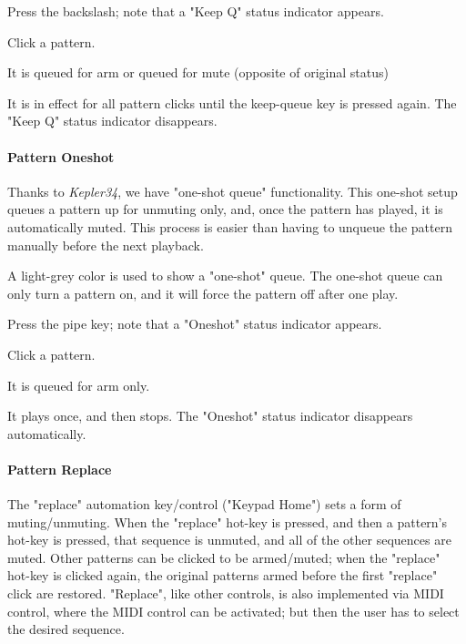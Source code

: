    \begin{enumber}
      \item Press the backslash; note that a "Keep Q" status indicator appears.
      \item Click a pattern.
      \item It is queued for arm or queued for mute (opposite of original status)
      \item It is in effect for all pattern clicks until the keep-queue key
         is pressed again.
         The "Keep Q" status indicator disappears.
   \end{enumber}

\paragraph{Pattern Oneshot}
\label{paragraph:patterns_pattern_oneshot}

   Thanks to \textsl{Kepler34}, we have "one-shot queue"
   functionality.  This one-shot setup queues a pattern up for unmuting only,
   and, once the pattern has played, it is automatically muted.  This process
   is easier than having to unqueue the pattern manually before the next
   playback.

   A light-grey color is used to show a "one-shot" queue.
   The one-shot queue can only turn a pattern on, and it
   will force the pattern off after one play.

   \begin{enumber}
      \item Press the pipe key; note that a "Oneshot" status indicator appears.
      \item Click a pattern.
      \item It is queued for arm only.
      \item It plays once, and then stops.
         The "Oneshot" status indicator disappears automatically.
   \end{enumber}

\paragraph{Pattern Replace}
\label{paragraph:patterns_pattern_replace}

   The "replace" automation key/control ("Keypad Home")
   sets a form of muting/unmuting.
   When the "replace" hot-key is
   pressed, and then a pattern's hot-key is pressed,
   that sequence is unmuted, and all of the other sequences are muted.
   Other patterns can be clicked to be armed/muted; when the "replace" hot-key
   is clicked again, the original patterns armed before the first "replace"
   click are restored.
   "Replace", like other controls, is also implemented via MIDI control,
   where the MIDI control can be activated; but then the user has to select
   the desired sequence.  


